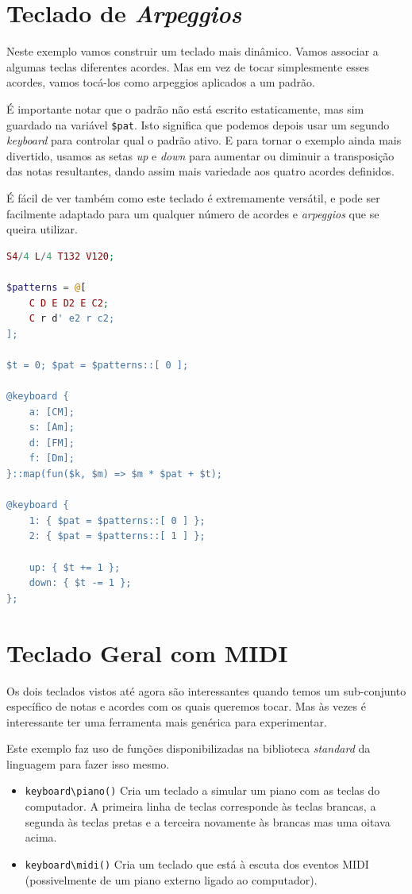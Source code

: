 \section{Teclado de \textit{Arpeggios}}
Neste exemplo vamos construir um teclado mais dinâmico. Vamos associar a algumas teclas diferentes acordes. Mas em vez de tocar simplesmente esses acordes, vamos tocá-los como arpeggios aplicados a um padrão.

É importante notar que o padrão não está escrito estaticamente, mas sim guardado na variável \texttt{\$pat}. Isto significa que podemos depois usar um segundo \textit{keyboard} para controlar qual o padrão ativo. E para tornar o exemplo ainda mais divertido, usamos as setas \textit{up} e \textit{down} para aumentar ou diminuir a transposição das notas resultantes, dando assim mais variedade aos quatro acordes definidos.

É fácil de ver também como este teclado é extremamente versátil, e pode ser facilmente adaptado para um qualquer número de acordes e \textit{arpeggios} que se queira utilizar.

\begin{lstlisting}[caption=Definição de um teclado de acordes,language=PHP]
S4/4 L/4 T132 V120;

$patterns = @[
    C D E D2 E C2;
    C r d' e2 r c2;
];

$t = 0; $pat = $patterns::[ 0 ];

@keyboard {
    a: [CM];
    s: [Am];
    d: [FM];
    f: [Dm];
}::map(fun($k, $m) => $m * $pat + $t);

@keyboard {
    1: { $pat = $patterns::[ 0 ] };
    2: { $pat = $patterns::[ 1 ] };

    up: { $t += 1 };
    down: { $t -= 1 };
};
\end{lstlisting}

\section{Teclado Geral com MIDI}
Os dois teclados vistos até agora são interessantes quando temos um sub-conjunto específico de notas e acordes com os quais queremos tocar. Mas às vezes é interessante ter uma ferramenta mais genérica para experimentar.

Este exemplo faz uso de funções disponibilizadas na biblioteca \textit{standard} da linguagem para fazer isso mesmo. 

\begin{itemize}
 \item \texttt{keyboard\textbackslash{}piano()} Cria um teclado a simular um piano com as teclas do computador. A primeira linha de teclas corresponde às teclas brancas, a segunda às teclas pretas e a terceira novamente às brancas mas uma oitava acima.
 \item \texttt{keyboard\textbackslash{}midi()} Cria um teclado que está à escuta dos eventos MIDI (possivelmente de um piano externo ligado ao computador).
 \end{itemize}
 

